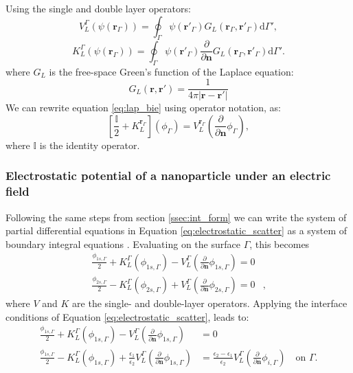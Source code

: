 Using the single and double layer operators:
%
\begin{equation}\label{eq:single_layer}
   V^{\Gamma}_L (\psi(\mathbf{r}_\Gamma)) = \oint_\Gamma \psi(\mathbf{r}'_\Gamma) G_L(\mathbf{r}_\Gamma, \mathbf{r}'_\Gamma) \text{d} \Gamma',
   \end{equation}
%
\begin{equation}\label{eq:double_layer}
   K^{\Gamma}_L (\psi(\mathbf{r}_\Gamma)) = \oint_\Gamma \psi(\mathbf{r}'_\Gamma) \frac{\partial}{\partial \mathbf{n}}G_L(\mathbf{r}_\Gamma, \mathbf{r}'_\Gamma) \text{d} \Gamma'.
\end{equation}
%
where $G_L$ is the free-space Green's function of the Laplace equation:
%
\begin{equation}
   G_L(\mathbf{r},\mathbf{r}') = \frac{1}{4\pi|\mathbf{r}-\mathbf{r}'|}
\end{equation}
%
We can rewrite equation \eqref{eq:lap_bie} using operator notation, as:
%
\begin{equation} \label{eq:lap_operator}
\left[ \frac{\mathbb{I}}{2} + K_L^{\mathbf{r}_\Gamma} \right] \left( \phi_\Gamma \right) = V_L^{\mathbf{r}_\Gamma} \left( \frac{\partial}{\partial \mathbf{n}} \phi_\Gamma \right),
\end{equation}
%
where $\mathbb{I}$ is the identity operator.

\subsubsection{Electrostatic potential of a nanoparticle under an electric field} \label{sec:pot_elec_field}

Following the same steps from section \ref{ssec:int_form}  we can write the system of partial differential equations 
in Equation \eqref{eq:electrostatic_scatter} as a system of boundary integral equations \cite{BrebbiaDominguez1992}. Evaluating on the
surface $\Gamma$, this becomes
%
\begin{align} \label{eq:integral_eq_lspr_nobc}
\frac{\phi_{1s,\Gamma}}{2}+ K_{L}^{\Gamma}(\phi_{1s,\Gamma}) - V_{L}^{\Gamma} \left(\frac{\partial}{\partial \mathbf{n}}\phi_{1s,\Gamma} \right) = 0&  \nonumber \\
\frac{\phi_{2s,\Gamma}}{2} - K_{L}^{\Gamma}(\phi_{2s,\Gamma}) + V_{L}^{\Gamma} \left( \frac{\partial}{\partial \mathbf{n}} \phi_{2s,\Gamma} \right) = 0&,
\end{align}
%
where $V$ and $K$ are the single- and double-layer operators.
%
Applying the interface conditions of Equation \eqref{eq:electrostatic_scatter},
leads to:
%
\begin{align} \label{eq:integral_eq_lspr}
\frac{\phi_{1s,\Gamma}}{2}+ K_{L}^{\Gamma}(\phi_{1s,\Gamma}) - V_{L}^{\Gamma} \left(\frac{\partial}{\partial \mathbf{n}}\phi_{1s,\Gamma} \right) &= 0  \nonumber \\
\frac{\phi_{1s,\Gamma}}{2} - K_{L}^{\Gamma}(\phi_{1s,\Gamma}) + \frac{\epsilon_1}{\epsilon_2}V_{L}^{\Gamma} \left( \frac{\partial}{\partial \mathbf{n}} \phi_{1s,\Gamma}  \right) &=
 \frac{\epsilon_2-\epsilon_1}{\epsilon_2}V_{L}^{\Gamma}\left( \frac{\partial}{\partial \mathbf{n}} \phi_{i,\Gamma} \right)\quad \text{on $\Gamma$.}
\end{align}
%
